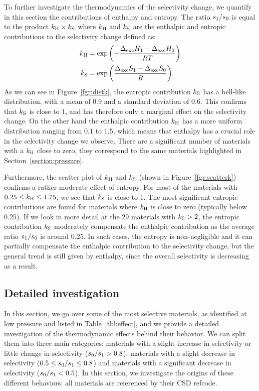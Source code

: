 \documentclass[main.tex]{subfiles}
\begin{document}
  To further investigate the thermodynamics of the selectivity change, we quantify in this section the contributions of enthalpy and entropy. The ratio ${s_{\text{1}}}/{s_{\text{0}}}$ is equal to the product $k_{\text{H}} \times k_{\text{S}}$ where $k_{\text{H}}$ and $k_{\text{S}}$ are the enthalpic and entropic contributions to the selectivity change defined as:
  \begin{equation}
  \label{eqn:effects}
      \begin{split}
       k_{\text{H}} & = \exp\left(-\dfrac{\Delta_{\text{exc}}H_{\text{1}}-\Delta_{\text{exc}}H_{\text{0}}}{RT}\right) \\ k_{\text{S}} & = \exp\left(\dfrac{\Delta_{\text{exc}}S_{\text{1}}-\Delta_{\text{exc}}S_{\text{0}}}{R}\right)
      \end{split}
  \end{equation}
  As we can see in Figure~\ref{fgr:distk}, the entropic contribution $k_{\text{S}}$ has a bell-like distribution, with a mean of $0.9$ and a standard deviation of $0.6$. This confirms that $k_{\text{S}}$ is close to $1$, and has therefore only a marginal effect on the selectivity change. On the other hand the enthalpic contribution $k_{\text{H}}$ has a more uniform distribution ranging from $0.1$ to $1.5$, which means that enthalpy has a crucial role in the selectivity change we observe. There are a significant number of materials with a $k_{\text{H}}$ close to zero, they correspond to the same materials highlighted in Section~\ref{section:pressure}.
  
  Furthermore, the scatter plot of $k_{\text{H}}$ and $k_{\text{S}}$ (shown in Figure~\ref{fgr:scatterk}) confirms a rather moderate effect of entropy. For most of the materials with $0.25 \le k_{\text{H}} \le 1.75$, we see that $k_{\text{S}}$ is close to 1. The most significant entropic contributions are found for materials where $k_{\text{H}}$ is close to zero (typically below 0.25). If we look in more detail at the 29 materials with $k_{\text{S}}>2$, the entropic contribution $k_{\text{S}}$ moderately compensate the enthalpic contribution as the average ratio $s_{\text{1}}/s_{\text{0}}$ is around $0.25$. In such cases, the entropy is non-negligible and it can partially compensate the enthalpic contribution to the selectivity change, but the general trend is still given by enthalpy, since the overall selectivity is decreasing as a result.
  
  
  \subsection{Detailed investigation}
  \label{sec:archetypes}
  
  In this section, we go over some of the most selective materials, as identified at low pressure and listed in Table~\ref{tbl:effect}, and we provide a detailed investigation of the thermodynamic effects behind their behavior. We can split them into three main categories: materials with a slight increase in selectivity or little change in selectivity ($s_{\text{0}}/s_{\text{1}} > 0.8$), materials with a slight decrease in selectivity ($0.5 \le s_{\text{0}}/s_{\text{1}} \le 0.8$) and materials with a significant decrease in selectivity ($s_{\text{0}}/s_{\text{1}} < 0.5$). In this section, we investigate the origins of these different behaviors: all materials are referenced by their CSD refcode.
  
\end{document}
